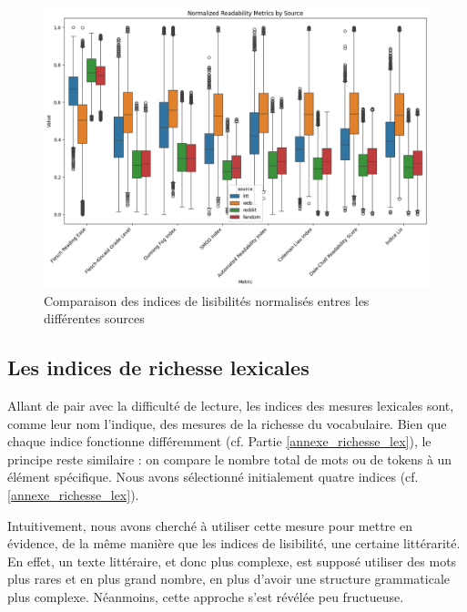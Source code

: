 \documentclass[12pt,a4paper,oneside,titlepage]{book} %
\begin{document}
	
	
	\begin{figure}
		\centering
		\includegraphics[scale=0.45]{illustration/boxplot_readability_V2.png}
		\caption{Comparaison des indices de lisibilités normalisés entres les différentes sources}
		\label{fig:comparaison_readability}
	\end{figure}
	
\pagebreak
	
	
	
	\subsection{Les indices de richesse lexicales}

Allant de pair avec la difficulté de lecture, les indices des mesures lexicales sont, comme leur nom l'indique, des mesures de la richesse du vocabulaire. Bien que chaque indice fonctionne différemment (cf. Partie \ref{annexe_richesse_lex}), le principe reste similaire : on compare le nombre total de mots ou de tokens à un élément spécifique. Nous avons sélectionné initialement quatre indices (cf. \ref{annexe_richesse_lex}).

Intuitivement, nous avons cherché à utiliser cette mesure pour mettre en évidence, de la même manière que les indices de lisibilité, une certaine littérarité. En effet, un texte littéraire, et donc plus complexe, est supposé utiliser des mots plus rares et en plus grand nombre, en plus d'avoir une structure grammaticale plus complexe. Néanmoins, cette approche s'est révélée peu fructueuse. 
\end{document}
